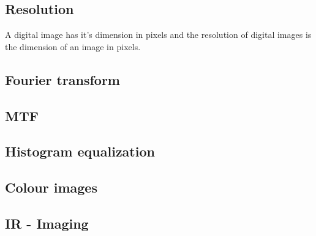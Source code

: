 \subsection{Resolution}
A digital image has it's dimension in pixels and the resolution of digital images is the dimension of an image in pixels.

\subsection{Fourier transform}

\subsection{MTF}

\subsection{Histogram equalization}

\subsection{Colour images}

\subsection{IR - Imaging}